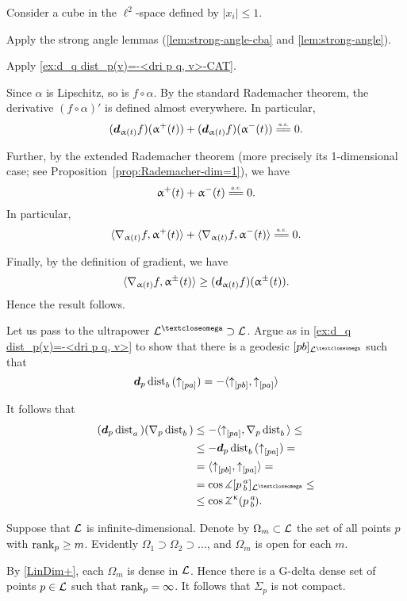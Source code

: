 Consider a cube in the $\ell^2$-space defined by $|x_i|\le 1$.

Apply the strong angle lemmas
(\ref{lem:strong-angle-cba}
and \ref{lem:strong-angle}).

 Apply \ref{ex:d_q dist_p(v)=-<dri p q, v>-CAT}.

Since $\alpha$ is Lipschitz, so is $f\circ\alpha$.
By the standard Rademacher theorem, the derivative $(f\circ\alpha)'$ is defined almost everywhere.
In particular, 
\[(\dd_{\alpha(t)}f)(\alpha^+(t))+(\dd_{\alpha(t)}f)(\alpha^-(t))\ae0.\]

Further, by the extended Rademacher theorem (more precisely its 1-dimensional case; see Proposition~\ref{prop:Rademacher-dim=1}),
we have 
\[\alpha^+(t)+\alpha^-(t)\ae0.\]
In particular,
\[\<\nabla_{\alpha(t)}f,\alpha^+(t)\>+\<\nabla_{\alpha(t)}f,\alpha^-(t)\>
\ae0.\]

Finally, by the definition of gradient, we have 
\[\<\nabla_{\alpha(t)}f,\alpha^\pm(t)\>\ge (\dd_{\alpha(t)}f)(\alpha^\pm(t)).\]
Hence the result follows.

Let us pass to the ultrapower $\spc{L}^\o\supset\spc{L}$.
Argue as in \ref{ex:d_q dist_p(v)=-<dri p q, v>} to show that there is a geodesic $[pb]_{\spc{L}^\o}$ such that 
\[\bm{d}_p\mathop{\rm dist}\nolimits_{b}^{{}}{}({\uparrow}_{[{p}{a}]})=-\langle{\uparrow}_{[{p}{b}]},{\uparrow}_{[{p}{a}]}\rangle\]

It follows that
\begin{align*}(\dd_p\distfun{a}{}{})(\nabla_p\distfun{b}{}{})&\le-\langle\dir pa,\nabla_p\distfun{b}{}{} \rangle\le
\\
&\le -\dd_p\distfun{b}{}{}(\dir pa)=
\\
&=\langle\dir pb, \dir pa\rangle=
\\
&= \cos\mangle\hinge p a b _{\spc{L}^\o}\le 
\\
&\le \cos\angk\kappa p a b.
\end{align*}


Suppose that $\mathcal{L}$ is infinite-dimensional.
Denote by $\Omega_m\subset \spc{L}$ the set of all points $p$ with $\rank_p\ge m$.
Evidently $\Omega_1\supset \Omega_2\supset\dots$, and $\Omega_m$ is open for each $m$.

By \ref{LinDim+}, each $\Omega_m$ is dense in $\mathcal{L}$.
Hence there is a G-delta dense set of points $p\in\spc{L}$ such that $\mathop{\rm rank}\nolimits_p=\infty$.
It follows that $\Sigma_p$ is not compact.

